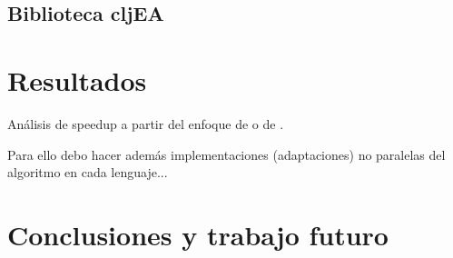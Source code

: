 \documentclass[runningheads]{llncs}
\begin{document}
\subsection{Biblioteca cljEA}
    


\section{Resultados}
\label{sec:results}

Análisis de speedup a partir del enfoque de \cite{Alba2002} o de \cite{Barr1993}.

Para ello debo hacer además implementaciones (adaptaciones) no paralelas del algoritmo en cada lenguaje...

\section{Conclusiones y trabajo futuro}
\label{sec:conclusions}


%




\end{document}
